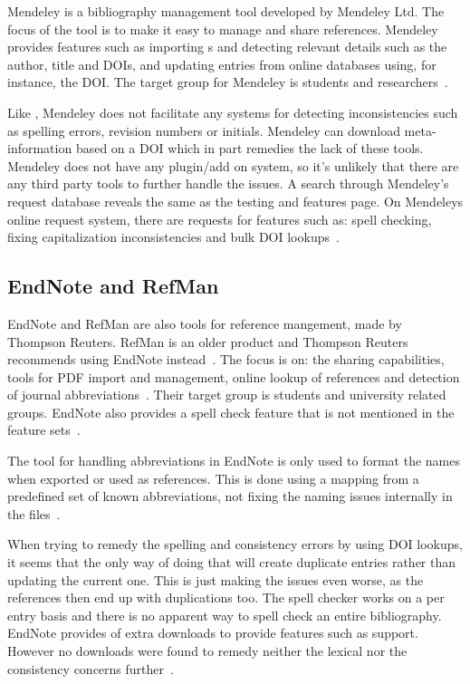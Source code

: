 Mendeley is a bibliography management tool developed by Mendeley Ltd.
The focus of the tool is to make it easy to manage and share
references.  Mendeley provides features such as importing s
and detecting relevant details such as the author, title and DOIs, and
updating entries from online databases using, for instance, the DOI.
The target group for Mendeley is students and
researchers~\cite{mendeley_features}.

Like {\bibtex}, Mendeley does not facilitate any systems for detecting
inconsistencies such as spelling errors, revision numbers or initials.
Mendeley can download meta-information based on a DOI which in part
remedies the lack of these tools.  Mendeley does not have any
plugin/add on system, so it's unlikely that there are any third party
tools to further handle the {\bibtex} issues. A search through
Mendeley's request database reveals the same as the testing and
features page.  On Mendeleys online request system, there are requests
for features such as: spell checking, fixing capitalization
inconsistencies and bulk DOI lookups~\cite{mendeley_request_bulk_doi,
  mendeley_request_capitalization, mendeley_request_spellcheck,
  mendeley_request_lowercase}.

\subsection{EndNote and RefMan}
EndNote and RefMan are also tools for reference mangement, made by
Thompson Reuters.  RefMan is an older product and Thompson Reuters
recommends using EndNote instead~\cite{refman_switch,
  refman_features}.  The focus is on: the sharing capabilities, tools
for PDF import and management, online lookup of references and
detection of journal abbreviations~\cite{endnote_basic_features,
  endnote_x7_features}.  Their target group is students and university
related groups.  EndNote also provides a spell check feature that is
not mentioned in the feature sets~\cite{endnote_spellcheck}.

The tool for handling abbreviations in EndNote is only used to format
the names when exported or used as references.  This is done using a
mapping from a predefined set of known abbreviations, not fixing the
naming issues internally in the files~\cite{endnote_terms_journals}.

When trying to remedy the spelling and consistency errors by using DOI
lookups, it seems that the only way of doing that will create
duplicate entries rather than updating the current one. This is just
making the issues even worse, as the references then end up with
duplications too.  The spell checker works on a per entry basis and
there is no apparent way to spell check an entire bibliography.
EndNote provides of extra downloads to provide features such as
{\bibtex} support.  However no downloads were found to remedy neither
the lexical nor the consistency concerns
further~\cite{endnote_downloads}.


